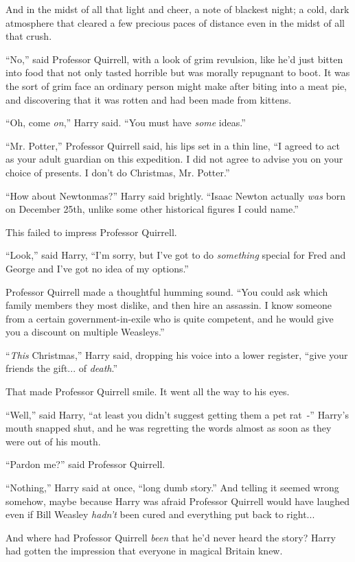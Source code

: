 And in the midst of all that light and cheer, a note of blackest night; a cold, dark atmosphere that cleared a few precious paces of distance even in the midst of all that crush.

``No,'' said Professor Quirrell, with a look of grim revulsion, like he'd just bitten into food that not only tasted horrible but was morally repugnant to boot. It was the sort of grim face an ordinary person might make after biting into a meat pie, and discovering that it was rotten and had been made from kittens.

``Oh, come \emph{on},'' Harry said. ``You must have \emph{some} ideas.''

``Mr. Potter,'' Professor Quirrell said, his lips set in a thin line, ``I agreed to act as your adult guardian on this expedition. I did not agree to advise you on your choice of presents. I don't do Christmas, Mr. Potter.''

``How about Newtonmas?'' Harry said brightly. ``Isaac Newton actually \emph{was} born on December 25th, unlike some other historical figures I could name.''

This failed to impress Professor Quirrell.

``Look,'' said Harry, ``I'm sorry, but I've got to do \emph{something} special for Fred and George and I've got no idea of my options.''

Professor Quirrell made a thoughtful humming sound. ``You could ask which family members they most dislike, and then hire an assassin. I know someone from a certain government-in-exile who is quite competent, and he would give you a discount on multiple Weasleys.''

``\emph{This} Christmas,'' Harry said, dropping his voice into a lower register, ``give your friends the gift... of \emph{death}.''

That made Professor Quirrell smile. It went all the way to his eyes.

``Well,'' said Harry, ``at least you didn't suggest getting them a pet rat~-'' Harry's mouth snapped shut, and he was regretting the words almost as soon as they were out of his mouth.

``Pardon me?'' said Professor Quirrell.

``Nothing,'' Harry said at once, ``long dumb story.'' And telling it seemed wrong somehow, maybe because Harry was afraid Professor Quirrell would have laughed even if Bill Weasley \emph{hadn't} been cured and everything put back to right...

And where had Professor Quirrell \emph{been} that he'd never heard the story? Harry had gotten the impression that everyone in magical Britain knew.

